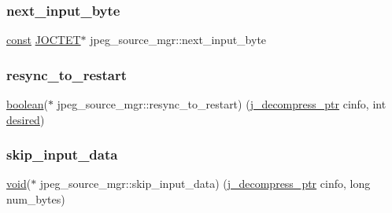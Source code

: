\mbox{\label{structjpeg__source__mgr_aad884e7f4ba7496ab0f56c942c7585c1}} 
\subsubsection{\texorpdfstring{next\+\_\+input\+\_\+byte}{next\_input\_byte}}
{\footnotesize\ttfamily \hyperlink{zconf_8h_a2c212835823e3c54a8ab6d95c652660e}{const} \hyperlink{jmorecfg_8h_a356ad249f20e691b520da439f92cccbc}{J\+O\+C\+T\+ET}$\ast$ jpeg\+\_\+source\+\_\+mgr\+::next\+\_\+input\+\_\+byte}

\mbox{\label{structjpeg__source__mgr_aad6c53cd531bedebd8f4a4617944affa}} 
\subsubsection{\texorpdfstring{resync\+\_\+to\+\_\+restart}{resync\_to\_restart}}
{\footnotesize\ttfamily \hyperlink{jconfig_8h_a7670a4e8a07d9ebb00411948b0bbf86d}{boolean}($\ast$ jpeg\+\_\+source\+\_\+mgr\+::resync\+\_\+to\+\_\+restart) (\hyperlink{jpeglib_8h_a00c7d78af44bd26a901c791ccfc1e178}{j\+\_\+decompress\+\_\+ptr} cinfo, int \hyperlink{jpeglib_8h_a3450f7500f843178b4517d0e7ef2b537}{desired})}

\mbox{\label{structjpeg__source__mgr_a50932fc835dea9941ebe825ef08f3e1d}} 
\subsubsection{\texorpdfstring{skip\+\_\+input\+\_\+data}{skip\_input\_data}}
{\footnotesize\ttfamily \hyperlink{png_8h_ac9c84fa68bbad002983e35ce3663c686}{void}($\ast$ jpeg\+\_\+source\+\_\+mgr\+::skip\+\_\+input\+\_\+data) (\hyperlink{jpeglib_8h_a00c7d78af44bd26a901c791ccfc1e178}{j\+\_\+decompress\+\_\+ptr} cinfo, long num\+\_\+bytes)}

